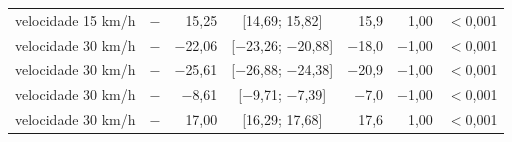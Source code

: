 \begin{tabular}{@{}llrcrrr@{}}
velocidade 15 km/h & \polD{} $-$ \polC{} & 15,25 & [14,69; 15,82] & 15,9 & 1,00 & $<$0,001 \\
velocidade 30 km/h & \polBOR{} $-$ \polA{} & $-$22,06 & [$-$23,26; $-$20,88] & $-$18,0 & $-$1,00 & $<$0,001 \\
velocidade 30 km/h & \polC{} $-$ \polA{} & $-$25,61 & [$-$26,88; $-$24,38] & $-$20,9 & $-$1,00 & $<$0,001 \\
velocidade 30 km/h & \polD{} $-$ \polA{} & $-$8,61 & [$-$9,71; $-$7,39] & $-$7,0 & $-$1,00 & $<$0,001 \\
velocidade 30 km/h & \polD{} $-$ \polC{} & 17,00 & [16,29; 17,68] & 17,6 & 1,00 & $<$0,001 \\
\bottomrule
\end{tabular}
